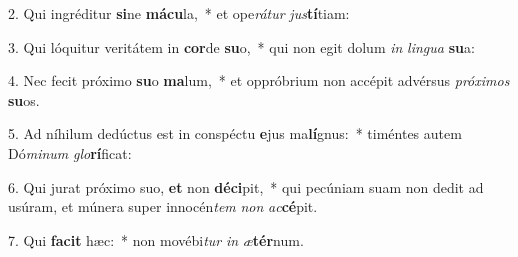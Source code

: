 2. Qui ingréditur \textbf{si}ne \textbf{má}\textbf{cu}la,~*  et ope\textit{rá}\textit{tur} \textit{jus}\textbf{tí}tiam:\

3. Qui lóquitur veritátem in \textbf{cor}de \textbf{su}o,~*  qui non egit dolum \textit{in} \textit{lin}\textit{gua} \textbf{su}a:\

4. Nec fecit próximo \textbf{su}o \textbf{ma}lum,~*  et oppróbrium non accépit advérsus \textit{pró}\textit{xi}\textit{mos} \textbf{su}os.\

5. Ad níhilum dedúctus est in conspéctu \textbf{e}jus ma\textbf{lí}gnus:~*  timéntes autem Dó\textit{mi}\textit{num} \textit{glo}\textbf{rí}ficat:\

6. Qui jurat próximo suo, \textbf{et} non \textbf{dé}\textbf{ci}pit,~*  qui pecúniam suam non dedit ad usúram, et múnera super innocén\textit{tem} \textit{non} \textit{ac}\textbf{cé}pit.\

7. Qui \textbf{fa}\textbf{cit} hæc:~*  non movébi\textit{tur} \textit{in} \textit{æ}\textbf{tér}num.\

